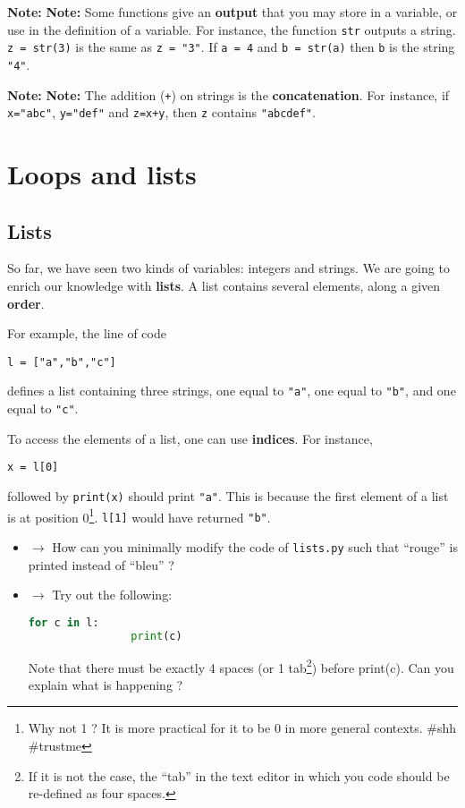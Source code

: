 \documentclass{article}
\newcommand{\note}[1]{
\begin{mdframed}[backgroundcolor=green!30!white]
\textbf{Note:} #1
\end{mdframed}
}
\begin{document}
\note{
\textbf{Note:} Some functions give an \textbf{output} that you may store in a
variable, or use in the definition of a variable. For instance, the
function \texttt{str} outputs a string. \texttt{z = str(3)} is the 
same as \texttt{z = "3"}. If \texttt{a = 4} and \texttt{b = str(a)}
then \texttt{b} is the string \texttt{"4"}.
}

\note{
\textbf{Note: } The addition (\texttt{+}) on strings is the \textbf{concatenation}.
For instance, if \texttt{x="abc"}, \texttt{y="def"} and \texttt{z=x+y},
then \texttt{z} contains \texttt{"abcdef"}.
}

\section{Loops and lists}

\subsection{Lists}

So far, we have seen two kinds of variables: integers and strings. We are
going to enrich our knowledge with \textbf{lists}. A list contains
several elements, along a given \textbf{order}.

For example, the line of code
\begin{center}
    {\tt l = ["a","b","c"]}
\end{center}

defines a list containing three strings, one equal to {\tt "a"}, one equal
to {\tt "b"}, and one equal to {\tt "c"}.

To access the elements of a list, one can use \textbf{indices}. For instance,
\begin{center}
    {\tt x = l[0]}
\end{center}
followed by {\tt print(x)} should print {\tt "a"}. This is because the first
element of a list is at position 0\footnote{Why not 1 ? It is more practical
for it to be 0 in more general contexts. \#shh \#trustme}. {\tt l[1]} would have
returned {\tt "b"}.

\begin{mdframed}[backgroundcolor=black!20!white]

\begin{itemize}
    \item $\rightarrow$ How can you minimally modify the code of {\tt lists.py}
        such that ``rouge'' is printed instead of ``bleu'' ?
    \item $\rightarrow$ Try out the following:
        \begin{lstlisting}[language=Python]
            for c in l:
                print(c)
        \end{lstlisting}
        Note that there must be exactly 4 spaces (or 1 tab\footnote{If it is
        not the case, the ``tab'' in the text editor in which you code should
        be re-defined as
        four spaces.}) before print(c).
        Can you explain what is happening ?
\end{itemize}
\end{mdframed}
\end{document}
